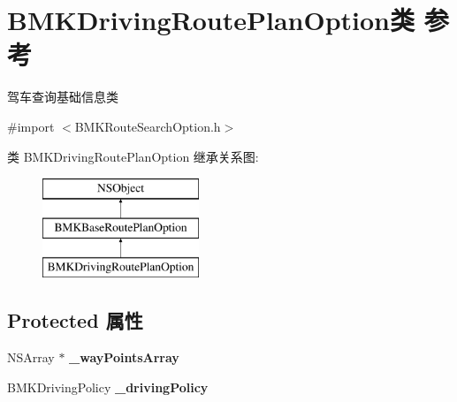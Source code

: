\hypertarget{interface_b_m_k_driving_route_plan_option}{}\section{B\+M\+K\+Driving\+Route\+Plan\+Option类 参考}
\label{interface_b_m_k_driving_route_plan_option}


驾车查询基础信息类  




{\ttfamily \#import $<$B\+M\+K\+Route\+Search\+Option.\+h$>$}

类 B\+M\+K\+Driving\+Route\+Plan\+Option 继承关系图\+:\begin{figure}[H]
\begin{center}
\leavevmode
\includegraphics[height=3.000000cm]{interface_b_m_k_driving_route_plan_option}
\end{center}
\end{figure}
\subsection*{Protected 属性}
\begin{DoxyCompactItemize}
\item 
\hypertarget{interface_b_m_k_driving_route_plan_option_aac7dd49a6a8f7133ff8207b59bbb03ab}{}N\+S\+Array $\ast$ {\bfseries \+\_\+way\+Points\+Array}\label{interface_b_m_k_driving_route_plan_option_aac7dd49a6a8f7133ff8207b59bbb03ab}

\item 
\hypertarget{interface_b_m_k_driving_route_plan_option_a6378c481740e1aff326001bff3c28738}{}B\+M\+K\+Driving\+Policy {\bfseries \+\_\+driving\+Policy}\label{interface_b_m_k_driving_route_plan_option_a6378c481740e1aff326001bff3c28738}

\end{DoxyCompactItemize}
